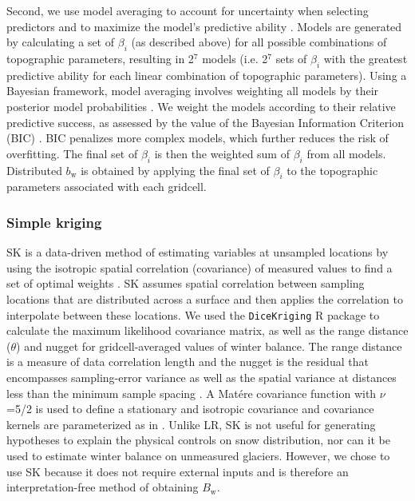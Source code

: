 \documentclass[twocolumn, letterpaper]{igs}
\begin{document}
Second, we use model averaging to account for uncertainty when selecting predictors and to maximize the model's predictive ability \citep{Madigan1994}. Models are generated by calculating a set of $\beta_i$ (as described above) for all possible combinations of topographic parameters, resulting in 2$^7$ models (i.e. 2$^7$ sets of $\beta_i$ with the greatest predictive ability for each linear combination of topographic parameters). Using a Bayesian framework, model averaging involves weighting all models by their posterior model probabilities \citep{Raftery1997}. We weight the models according to their relative predictive success, as assessed by the value of the Bayesian Information Criterion (BIC) \citep{Burnham2004}. BIC penalizes more complex models, which further reduces the risk of overfitting. The final set of $\beta_i$ is then the weighted sum of $\beta_i$ from all models. Distributed $b_\mathrm{w}$ is obtained by applying the final set of $\beta_i$ to the topographic parameters associated with each gridcell. 

\subsubsection{Simple kriging}

SK is a data-driven method of estimating variables at unsampled locations by using the isotropic spatial correlation (covariance) of measured values to find a set of optimal weights \citep{Davis1986, Li2008}. SK assumes spatial correlation between sampling locations that are distributed across a surface and then applies the correlation to interpolate between these locations. We used the \texttt{DiceKriging} R package \citep{Roustant2012} to calculate the maximum likelihood covariance matrix, as well as the range distance ($\theta$) and nugget for gridcell-averaged values of winter balance. The range distance is a measure of data correlation length and the nugget is the residual that encompasses sampling-error variance as well as the spatial variance at distances less than the minimum sample spacing \citep{Li2008}. A Mat\'ere covariance function with $\nu$=5/2 is used to define a stationary and isotropic covariance and covariance kernels are parameterized as in \cite{Rasmussen2006}. Unlike LR, SK is not useful for generating hypotheses to explain the physical controls on snow distribution, nor can it be used to estimate winter balance on unmeasured glaciers. However, we chose to use SK because it does not require external inputs and is therefore an interpretation-free method of obtaining $B_\mathrm{w}$.
\end{document}
